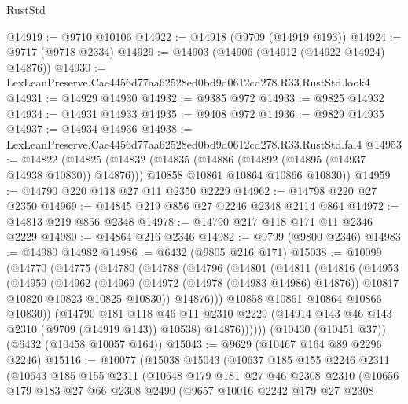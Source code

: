 \begin{lexlean}{RustStd}
\begin{coremodule}
@14919 := @9710 @10106
@14922 := @14918 (@9709 (@14919 @193))
@14924 := @9717 (@9718 @2334)
@14929 := @14903 (@14906 (@14912 (@14922 @14924) @14876))
@14930 := LexLeanPreserve.Cae4456d77aa62528ed0bd9d0612cd278.R33.RustStd.look4
@14931 := @14929 @14930
@14932 := @9385 @972
@14933 := @9825 @14932
@14934 := @14931 @14933
@14935 := @9408 @972
@14936 := @9829 @14935
@14937 := @14934 @14936
@14938 := LexLeanPreserve.Cae4456d77aa62528ed0bd9d0612cd278.R33.RustStd.fal4
@14953 := @14822
    (@14825
      (@14832
        (@14835 (@14886 (@14892 (@14895 (@14937 @14938 @10830)) @14876)))
        @10858
        @10861
        @10864
        @10866
        @10830))
@14959 := @14790 @220 @118 @27 @11 @2350 @2229
@14962 := @14798 @220 @27 @2350
@14969 := @14845 @219 @856 @27 @2246 @2348 @2114 @864
@14972 := @14813 @219 @856 @2348
@14978 := @14790 @217 @118 @171 @11 @2346 @2229
@14980 := @14864 @216 @2346
@14982 := @9799 (@9800 @2346)
@14983 := @14980 @14982
@14986 := @6432 (@9805 @216 @171)
@15038 := @10099
    (@14770
      (@14775
        (@14780
          (@14788
            (@14796
              (@14801
                (@14811
                  (@14816
                    (@14953
                      (@14959
                        (@14962
                          (@14969
                            (@14972 (@14978 (@14983 @14986) @14876))
                            @10817
                            @10820
                            @10823
                            @10825
                            @10830))
                        @14876)))
                  @10858
                  @10861
                  @10864
                  @10866
                  @10830))
              (@14790
                @181
                @118
                @46
                @11
                @2310
                @2229
                (@14914 @143 @46 @143 @2310 (@9709 (@14919 @143)) @10538)
                @14876))))))
    (@10430 (@10451 @37))
    (@6432 (@10458 @10057 @164))
@15043 := @9629 (@10467 @164 @89 @2296 @2246)
@15116 := @10077
    (@15038
      @15043
      (@10637
        @185
        @155
        @2246
        @2311
        (@10643
          @185
          @155
          @2311
          (@10648
            @179
            @181
            @27
            @46
            @2308
            @2310
            (@10656
              @179
              @183
              @27
              @66
              @2308
              @2490
              (@9657
                @10016
                @2242
                @179
                @27
                @2308

\end{coremodule}
\end{lexlean}
